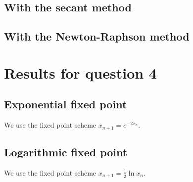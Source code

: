 \documentclass[11pt,letterpaper]{article}
\begin{document}
\subsection{With the secant method}



\subsection{With the Newton-Raphson method}



\section{Results for question 4}
\label{app:q4}

\subsection{Exponential fixed point}

We use the fixed point scheme $x_{n+1} = e^{-2x_n}$.



\subsection{Logarithmic fixed point}

We use the fixed point scheme $x_{n+1} = \frac{1}{2} \ln x_n$.


\end{document}

